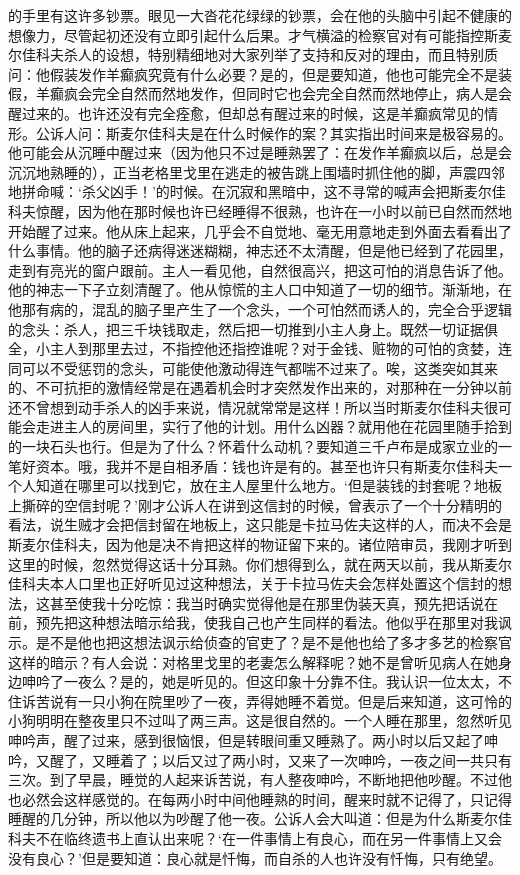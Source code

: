 的手里有这许多钞票。眼见一大沓花花绿绿的钞票，会在他的头脑中引起不健康的想像力，尽管起初还没有立即引起什么后果。才气横溢的检察官对有可能指控斯麦尔佳科夫杀人的设想，特别精细地对大家列举了支持和反对的理由，而且特别质问：他假装发作羊癫疯究竟有什么必要？是的，但是要知道，他也可能完全不是装假，羊癫疯会完全自然而然地发作，但同时它也会完全自然而然地停止，病人是会醒过来的。也许还没有完全痊愈，但却总有醒过来的时候，这是羊癫疯常见的情形。公诉人问：斯麦尔佳科夫是在什么时候作的案？其实指出时间来是极容易的。他可能会从沉睡中醒过来（因为他只不过是睡熟罢了：在发作羊癫疯以后，总是会沉沉地熟睡的），正当老格里戈里在逃走的被告跳上围墙时抓住他的脚，声震四邻地拼命喊：‘杀父凶手！’的时候。在沉寂和黑暗中，这不寻常的喊声会把斯麦尔佳科夫惊醒，因为他在那时候也许已经睡得不很熟，也许在一小时以前已自然而然地开始醒了过来。他从床上起来，几乎会不自觉地、毫无用意地走到外面去看看出了什么事情。他的脑子还病得迷迷糊糊，神志还不太清醒，但是他已经到了花园里，走到有亮光的窗户跟前。主人一看见他，自然很高兴，把这可怕的消息告诉了他。他的神志一下子立刻清醒了。他从惊慌的主人口中知道了一切的细节。渐渐地，在他那有病的，混乱的脑子里产生了一个念头，一个可怕然而诱人的，完全合乎逻辑的念头：杀人，把三千块钱取走，然后把一切推到小主人身上。既然一切证据俱全，小主人到那里去过，不指控他还指控谁呢？对于金钱、赃物的可怕的贪婪，连同可以不受惩罚的念头，可能使他激动得连气都喘不过来了。唉，这类突如其来的、不可抗拒的激情经常是在遇着机会时才突然发作出来的，对那种在一分钟以前还不曾想到动手杀人的凶手来说，情况就常常是这样！所以当时斯麦尔佳科夫很可能会走进主人的房间里，实行了他的计划。用什么凶器？就用他在花园里随手拾到的一块石头也行。但是为了什么？怀着什么动机？要知道三千卢布是成家立业的一笔好资本。哦，我并不是自相矛盾：钱也许是有的。甚至也许只有斯麦尔佳科夫一个人知道在哪里可以找到它，放在主人屋里什么地方。‘但是装钱的封套呢？地板上撕碎的空信封呢？’刚才公诉人在讲到这信封的时候，曾表示了一个十分精明的看法，说生贼才会把信封留在地板上，这只能是卡拉马佐夫这样的人，而决不会是斯麦尔佳科夫，因为他是决不肯把这样的物证留下来的。诸位陪审员，我刚才听到这里的时候，忽然觉得这话十分耳熟。你们想得到么，就在两天以前，我从斯麦尔佳科夫本人口里也正好听见过这种想法，关于卡拉马佐夫会怎样处置这个信封的想法，这甚至使我十分吃惊：我当时确实觉得他是在那里伪装天真，预先把话说在前，预先把这种想法暗示给我，使我自己也产生同样的看法。他似乎在那里对我讽示。是不是他也把这想法讽示给侦查的官吏了？是不是他也给了多才多艺的检察官这样的暗示？有人会说：对格里戈里的老妻怎么解释呢？她不是曾听见病人在她身边呻吟了一夜么？是的，她是听见的。但这印象十分靠不住。我认识一位太太，不住诉苦说有一只小狗在院里吵了一夜，弄得她睡不着觉。但是后来知道，这可怜的小狗明明在整夜里只不过叫了两三声。这是很自然的。一个人睡在那里，忽然听见呻吟声，醒了过来，感到很恼恨，但是转眼间重又睡熟了。两小时以后又起了呻吟，又醒了，又睡着了；以后又过了两小时，又来了一次呻吟，一夜之间一共只有三次。到了早晨，睡觉的人起来诉苦说，有人整夜呻吟，不断地把他吵醒。不过他也必然会这样感觉的。在每两小时中间他睡熟的时间，醒来时就不记得了，只记得睡醒的几分钟，所以他以为吵醒了他一夜。公诉人会大叫道：但是为什么斯麦尔佳科夫不在临终遗书上直认出来呢？‘在一件事情上有良心，而在另一件事情上又会没有良心？’但是要知道：良心就是忏悔，而自杀的人也许没有忏悔，只有绝望。